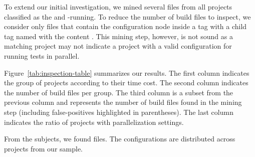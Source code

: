 To extend our initial investigation, we mined several \pomf{} files
from all \numMedLong{} projects classified as the \medg{} and
\longg{}-running.
To reduce the number of build files
to inspect, we consider only \pomf{} files that contain the
configuration node inside a  tag with a child tag named
 with the content .
This mining step, however, is not sound as a matching project may not 
indicate a project with a valid configuration for running tests in parallel.

Figure~\ref{tab:inspection-table} summarizes our results. The first
column indicates the group of projects according to their time cost.
The second column indicates the number of build files per group.  The
third column is a subset from the previous column and represents the
number of build files found in the mining step (including
false-positives highlighted in parentheses). The last column indicates
the ratio of projects with parallelization settings.

From the \numMedLong{} subjects, we found \pomMedLong{} \pomf{} files.
The \numPomMatched{} configurations are distributed across \numProjectsPar{} projects from our sample.
% 

